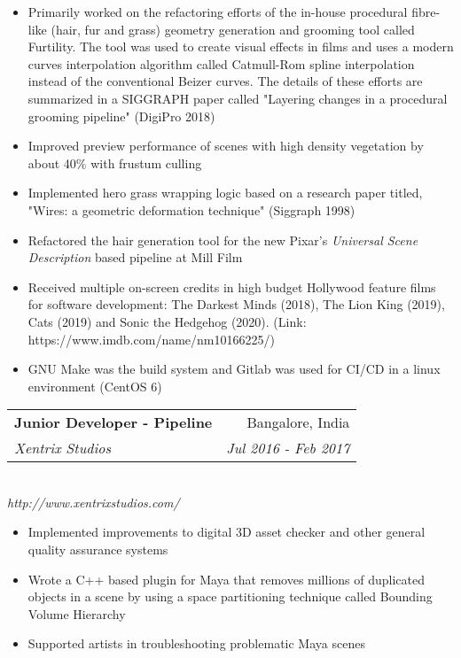 \documentclass[a4paper,11pt]{article}
\makeatletter
\newcommand{\resumeSubheading}[4]{
  \vspace{-1pt}\item
    \begin{tabular*}{0.97\textwidth}[t]{l@{\extracolsep{\fill}}r}
      \textbf{#1} & #2 \\
      \textit{\small#3} & \textit{\small #4} \\
    \end{tabular*}
    \vspace{-5pt}
}
\newcommand{\resumeItemListStart}{
  \begin{itemize}
}
\newcommand{\resumeItemListEnd}{
  \end{itemize}
  \vspace{-5pt}
}
\makeatother
\begin{document}
        \resumeItemListStart
            \item\small{{Primarily worked on the refactoring efforts of the in-house procedural fibre-like (hair, fur and grass) geometry generation and grooming tool called Furtility. The tool was used to create visual effects in films and uses a modern curves interpolation algorithm called Catmull-Rom spline interpolation instead of the conventional Beizer curves. The details of these efforts are summarized in a SIGGRAPH paper called "Layering changes in a procedural grooming pipeline" (DigiPro 2018) }}
            \item\small{{Improved preview performance of scenes with high density vegetation by about 40\% with frustum culling }}
            \item\small{{Implemented hero grass wrapping logic based on a research paper titled, "Wires: a geometric deformation technique" (Siggraph 1998) }}
            \item\small{{Refactored the hair generation tool for the new Pixar's \emph{Universal Scene Description} based pipeline at Mill Film }}
            \item\small{{Received multiple on-screen credits in high budget Hollywood feature films for software development: The Darkest Minds (2018), The Lion King (2019), Cats (2019) and Sonic the Hedgehog (2020). (Link: https://www.imdb.com/name/nm10166225/)}}
            \item\small{{GNU Make was the build system and Gitlab was used for CI/CD in a linux environment (CentOS 6) }}
        \resumeItemListEnd

      \resumeSubheading
        {Junior Developer - Pipeline}
        {Bangalore, India}
        {Xentrix Studios}
        {Jul 2016 - Feb 2017} \\
        \vspace{3pt}
        \textit{\small{http://www.xentrixstudios.com/}}

        \resumeItemListStart
          \item\small{{Implemented improvements to digital 3D asset checker and other general quality assurance systems}}
          \item\small{{Wrote a C++ based plugin for Maya that removes millions of duplicated objects in a scene by using a space partitioning technique called Bounding Volume Hierarchy}}
          \item\small{{Supported artists in troubleshooting problematic Maya scenes}}
        \resumeItemListEnd
\end{document}
